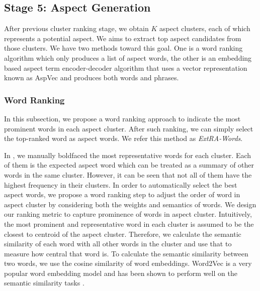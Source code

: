 \subsection{Stage 5: Aspect Generation}
\label{sec:word_ranking}
After previous cluster ranking stage, we obtain $K$ aspect 
clusters, each of which represents a potential aspect. 
We aims to extract top aspect candidates from those clusters.
We have two methods toward this goal. One is a word ranking algorithm
which only produces a list of aspect words, the other is an embedding
based aspect term encoder-decoder algorithm that uses a
vector representation known as AspVec and produces both words
and phrases. 

\subsubsection{Word Ranking}
In this subsection, we propose a word ranking approach to indicate the most prominent words in each aspect cluster. After such ranking, we can simply select the top-ranked word 
as aspect words. We refer this method as {\em ExtRA-Words}.

In ,
we manually boldfaced the most representative words for each cluster.  
Each of them is the expected aspect word which can be treated as 
a summary of other words in the same cluster.
However, it can be seen that not all of them have the highest frequency 
in their clusters.  
In order to automatically select the best aspect words,
we propose a word ranking step to adjust the order of word in aspect cluster by considering both the weights and semantics of words.
We design our ranking metric to capture prominence of words in aspect cluster.
Intuitively, the most prominent and representative word in each cluster
is assumed to be the closest to centroid of the aspect cluster.
Therefore, we calculate the semantic similarity of each word with all other 
words in the cluster and use that to measure how central that word is.
To calculate the semantic similarity between two words, 
we use the cosine similarity of word embeddings. 
Word2Vec is a very popular 
word embedding model and has been shown to perform well on 
the semantic similarity tasks \cite{levy2015improving}.

